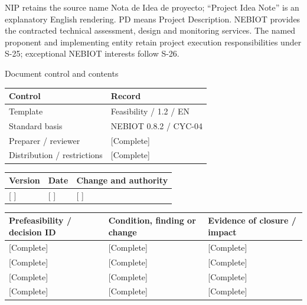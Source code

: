 \vspace{2mm}
NIP retains the source name Nota de Idea de proyecto; “Project Idea Note” is an explanatory English rendering. PD means Project Description.
\vspace{2mm}
NEBIOT provides the contracted technical assessment, design and monitoring services. The named proponent and implementing entity retain project execution responsibilities under S-25; exceptional NEBIOT interests follow S-26.
\clearpage
{\fontsize{23}{27}\selectfont\color{NEBGreen}Document control and contents\par}
\vspace{3mm}
{\sffamily\fontsize{8.3}{10.3}\selectfont\begin{longtable}{@{}P{50.55mm} P{117.94mm}@{}}
\toprule
\textbf{Control} & \textbf{Record}\\\midrule\endhead
\rule{0pt}{7.7mm}Template & Feasibility / 1.2 / EN\\\hline
\rule{0pt}{7.7mm}Standard basis & NEBIOT 0.8.2 / CYC-04\\\hline
\rule{0pt}{7.7mm}Preparer / reviewer & [Complete]\\\hline
\rule{0pt}{7.7mm}Distribution / restrictions & [Complete]\\\hline
\end{longtable}}
{\sffamily\fontsize{8.3}{10.3}\selectfont\begin{longtable}{@{}P{31.34mm} P{37.94mm} P{95.68mm}@{}}
\toprule
\textbf{Version} & \textbf{Date} & \textbf{Change and authority}\\\midrule\endhead
\rule{0pt}{7.7mm}[ ] & [ ] & [ ]\\\hline
\end{longtable}}
{\sffamily\fontsize{9.5}{11.4}\selectfont\tableofcontents}
{\sffamily\fontsize{8.3}{10.3}\selectfont\begin{longtable}{@{}P{49.49mm} P{57.74mm} P{57.74mm}@{}}
\toprule
\textbf{Prefeasibility / decision ID} & \textbf{Condition, finding or change} & \textbf{Evidence of closure / impact}\\\midrule\endhead
\rule{0pt}{7.7mm}[Complete] & [Complete] & [Complete]\\\hline
\rule{0pt}{7.7mm}[Complete] & [Complete] & [Complete]\\\hline
\rule{0pt}{7.7mm}[Complete] & [Complete] & [Complete]\\\hline
\rule{0pt}{7.7mm}[Complete] & [Complete] & [Complete]\\\hline
\end{longtable}}
